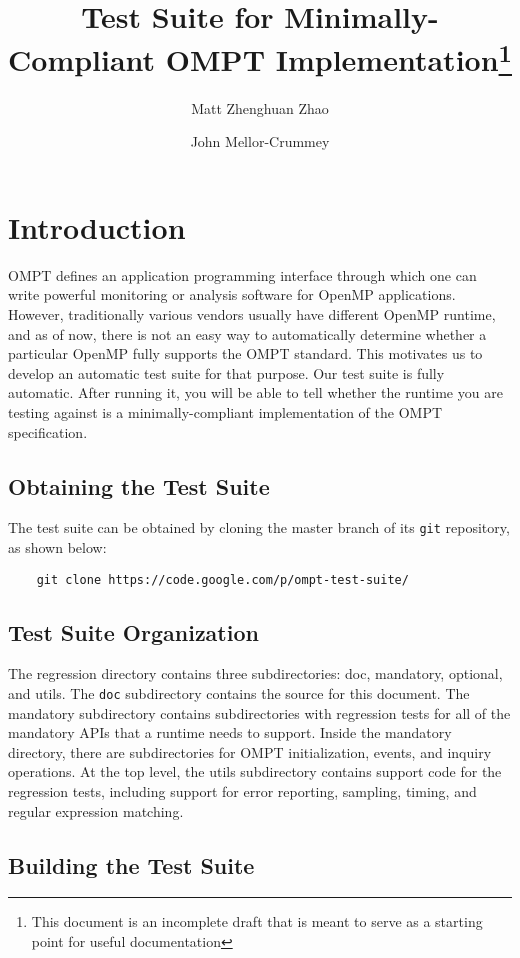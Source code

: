 \documentclass{article}
\title{Test Suite for Minimally-Compliant OMPT Implementation\thanks{This document is an incomplete draft that is meant to serve as a starting point for useful documentation}}
\author{ 
Matt Zhenghuan Zhao \and John Mellor-Crummey}
\begin{document}
     
\pagestyle{empty}

\setcounter{page}{1}
\pagestyle{plain}
                                           
\maketitle
\section{Introduction}
OMPT defines an application programming interface through which one can write powerful  monitoring or analysis software
for OpenMP applications. However, traditionally various vendors usually have different OpenMP runtime, and as of now,
there is not an easy way to automatically determine whether a particular OpenMP fully supports the OMPT standard.
This motivates us to develop an automatic test suite for that purpose. Our test suite is fully automatic. After running it,
you will be able to tell whether the runtime you are testing against is a minimally-compliant implementation of the OMPT 
specification. 


\subsection{Obtaining the Test Suite}
The test suite can be obtained by cloning the master branch of its {\tt git} repository, as shown below:
\begin{verbatim}
    git clone https://code.google.com/p/ompt-test-suite/
\end{verbatim}

    

\subsection{Test Suite Organization}
The regression directory contains three subdirectories: doc, mandatory,  optional, and utils. The {\tt doc} subdirectory contains the source for this document. The mandatory subdirectory  contains subdirectories with regression tests  for all of the mandatory APIs that a runtime needs to support. Inside the mandatory directory, there are subdirectories for OMPT  initialization, events, and inquiry operations. At the top level, the utils subdirectory contains support code for the regression tests, including support for error reporting, sampling, timing, and regular expression matching.


\subsection{Building the Test Suite}
\end{document}
